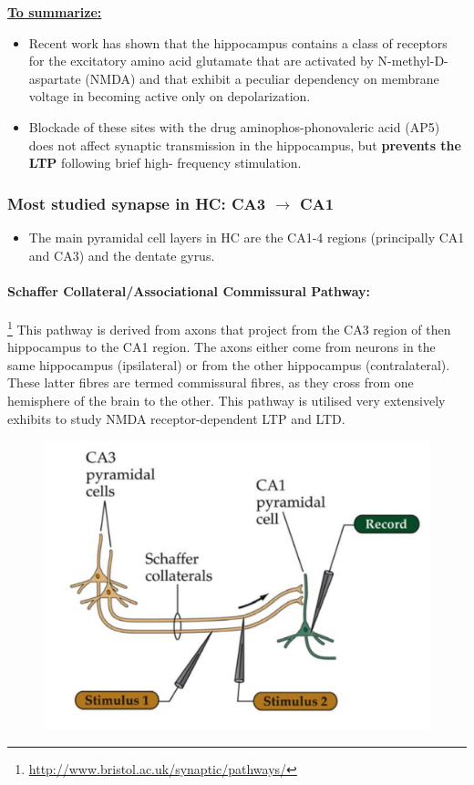 \documentclass[main]{subfiles}
\begin{document}
\noindent
\underline{\textbf{To summarize:}}
\begin{itemize}
    \item Recent work has shown that the hippocampus contains a class of receptors for the excitatory amino acid glutamate that are activated by N-methyl-D-aspartate (NMDA) and that exhibit a peculiar dependency on membrane voltage in becoming active only on depolarization.
    \item Blockade of these sites with the drug aminophos-phonovaleric acid (AP5) does not affect synaptic transmission in the hippocampus, but \textbf{prevents the  LTP} following brief high- frequency stimulation.

\end{itemize}


\subsubsection{Most studied synapse in HC: CA3 $\rightarrow$ CA1}
\begin{itemize}
    \item The main pyramidal cell layers in HC are the CA1-4 regions (principally CA1 and CA3) and the dentate gyrus.

\end{itemize}

 \paragraph{Schaffer Collateral/Associational Commissural Pathway:}\footnote{\url{http://www.bristol.ac.uk/synaptic/pathways/}} This pathway is derived from axons that project from the CA3 region of then hippocampus to the CA1 region. The axons either come from neurons in the same hippocampus (ipsilateral) or from the other hippocampus (contralateral). These latter fibres are termed commissural fibres, as they cross from one hemisphere of the brain to the other. This pathway is utilised very extensively exhibits to study NMDA receptor-dependent LTP and LTD.
 
 \begin{figure}[H]
    \centering
    \includegraphics[width=.6\textwidth]{03_PlasticityInTheBrain/figures/ca3_ca1.png}
    \label{fig:HC_synapses}
\end{figure}
    
\end{document}
